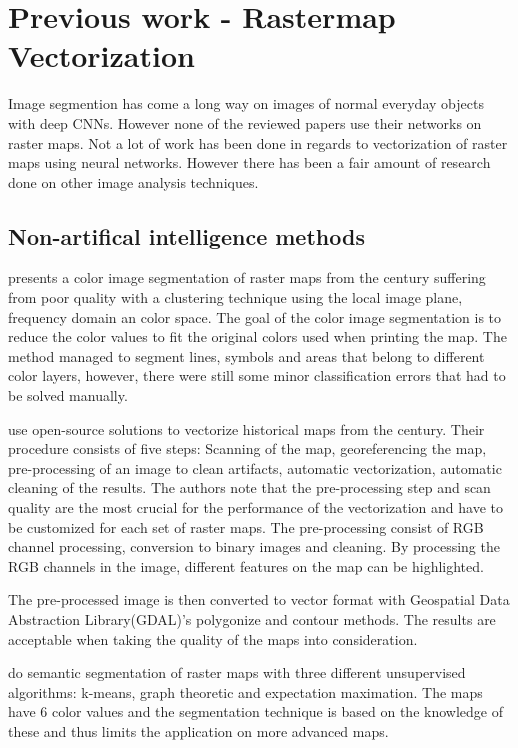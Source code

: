 \chapter{Previous work - Rastermap Vectorization}
Image segmention has come a long way on images of normal everyday objects with deep CNNs. However none of the reviewed papers use their networks on raster maps. Not a lot of work has been done in regards to vectorization of raster maps using neural networks. However there has been a fair amount of research done on other image analysis techniques.

\section{Non-artifical intelligence methods}

\citeauthor{Leyk2010}\cite{Leyk2010} presents a color image segmentation of raster maps from the  century suffering from poor quality with a clustering technique using the local image plane, frequency domain an color space. The goal of the color image segmentation is to reduce the color values to fit the original colors used when printing the map. The method managed to segment lines, symbols and areas that belong to different color layers, however, there were still some minor classification errors that had to be solved manually.

\citeauthor{Iosifescu2016}\cite{Iosifescu2016} use open-source solutions to vectorize historical maps from the  century. Their procedure consists of five steps: Scanning of the map, georeferencing the map, pre-processing of an image to clean artifacts, automatic vectorization, automatic cleaning of the results. The authors note that the pre-processing step and scan quality are the most crucial for the performance of the vectorization and have to be customized for each set of raster maps. The pre-processing consist of RGB channel processing, conversion to binary images and cleaning. By processing the RGB channels in the image, different features on the map can be highlighted.

The pre-processed image is then converted to vector format with Geospatial Data Abstraction Library\cite{OSGeo}(GDAL)'s polygonize and contour methods. The results are acceptable when taking the quality of the maps into consideration.

\citeauthor{Henderson}\cite{Henderson} do semantic segmentation of raster maps with three different unsupervised algorithms: k-means, graph theoretic and expectation maximation. The maps have 6 color values and the segmentation technique is based on the knowledge of these and thus limits the application on more advanced maps. 

